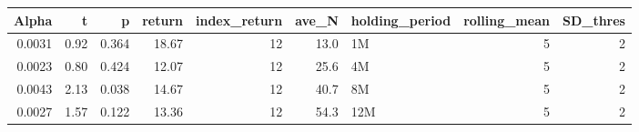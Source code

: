 \begin{table}[ht]
\centering
\begin{tabular}{rrrrrrlrr}
  \hline
Alpha & t & p & return & index\_return & ave\_N & holding\_period & rolling\_mean & SD\_thres \\ 
  \hline
0.0031 & 0.92 & 0.364 & 18.67 & 12 & 13.0 & 1M &  5 &  2 \\ 
  0.0023 & 0.80 & 0.424 & 12.07 & 12 & 25.6 & 4M &  5 &  2 \\ 
  0.0043 & 2.13 & 0.038 & 14.67 & 12 & 40.7 & 8M &  5 &  2 \\ 
  0.0027 & 1.57 & 0.122 & 13.36 & 12 & 54.3 & 12M &  5 &  2 \\ 
   \hline
\end{tabular}
\end{table}

